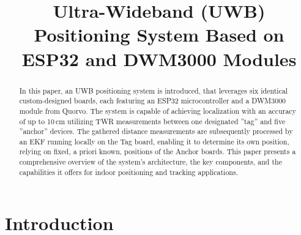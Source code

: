 \documentclass[conference, a4paper]{IEEEtran}
\begin{document}
\renewcommand{\baselinestretch}{0.97} %

\title{Ultra-Wideband (UWB) Positioning System Based on ESP32 and DWM3000 Modules}

\author{  
   \and
   
  }

\maketitle

\begin{abstract}
  In this paper, an \ac{UWB} positioning system is introduced, that leverages six identical custom-designed boards, each featuring an ESP32 microcontroller and a DWM3000 module from Quorvo.
  \newline
  The system is capable of achieving localization with an accuracy of up to 10\,cm utilizing \ac{TWR} measurements between one designated ''tag'' and five ''anchor'' devices.
  The gathered distance measurements are subsequently processed by an \ac{EKF} running locally on the Tag board, enabling it to determine its own position,
  relying on fixed, a priori known, positions of the Anchor boards.
  \newline
  This paper presents a comprehensive overview of the system's architecture, the key components, and the capabilities it offers for indoor positioning and tracking applications.
\end{abstract}


\IEEEpeerreviewmaketitle


\section{Introduction}
\label{sec:Introduction}
\end{document}
